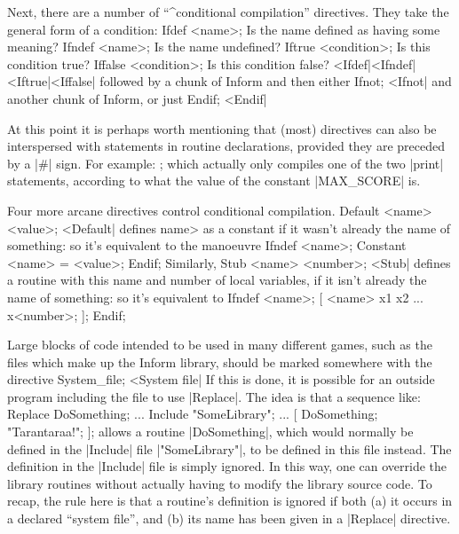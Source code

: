 \danger\ninepoint%
Next, there are a number of ``^{conditional compilation}'' directives.
They take the general form of a condition:
\beginstt
    Ifdef <name>;          Is the name defined as having some meaning?
    Ifndef <name>;         Is the name undefined?
    Iftrue <condition>;    Is this condition true?
    Iffalse <condition>;   Is this condition false?
\endtt^^|Ifdef|^^|Ifndef|^^|Iftrue|^^|Iffalse|
followed by a chunk of Inform and then either
\beginstt
    Ifnot;
\endtt^^|Ifnot|
and another chunk of Inform, or just
\beginstt
    Endif;
\endtt^^|Endif|

At this point it is perhaps worth mentioning that (most) directives can
also be interspersed with statements in routine declarations, provided
they are preceded by a |#| sign.  For example:
;
\endtt
which actually only compiles one of the two |print| statements, according to
what the value of the constant |MAX_SCORE| is.

\ddanger Four more arcane directives control conditional compilation.
\beginstt
    Default <name> <value>;
\endtt^^|Default|
defines \<name> as a constant if it wasn't already the name of something:
so it's equivalent to the manoeuvre
\beginstt
    Ifndef <name>;
    Constant <name> = <value>;
    Endif;
\endtt
Similarly,
\beginstt
    Stub <name> <number>;
\endtt^^|Stub|
defines a routine with this name and number of local variables, if it isn't
already the name of something: so it's equivalent to
\beginstt
    Ifndef <name>;
    [ <name> x1 x2 ... x<number>;
    ];
    Endif;
\endtt

\ddanger
Large blocks of code intended to be used in many different games, such as
the files which make up the Inform library, should be marked somewhere with
the directive
\beginstt
    System_file;
\endtt^^|System file|
If this is done, it is possible for an outside program including the file
to use |Replace|.  The idea is that a sequence like:
\beginstt
    Replace DoSomething;
    ...
    Include "SomeLibrary";
    ...
    [ DoSomething; "Tarantaraa!"; ];
\endtt
allows a routine |DoSomething|, which would normally be defined in the
|Include| file |"SomeLibrary"|, to be defined in this file instead.  The
definition in the |Include| file is simply ignored.  In this way, one can
override the library routines without actually having to modify the library
source code.  To recap, the rule here is that a routine's definition is
ignored if both (a) it occurs in a declared ``system file'', and (b)
its name has been given in a |Replace| directive.

